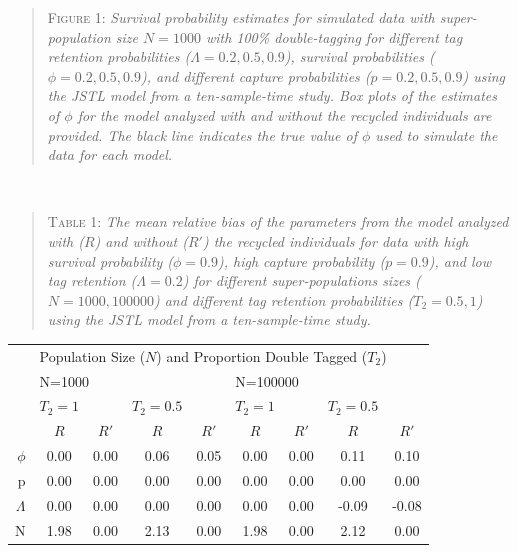 \documentclass[12pt]{article}
\begin{document}
\begin{quote}
\textsc{Figure 1:}
\textsl{Survival probability estimates for simulated data with super-population size $N=1000$ with 100\% double-tagging for different tag retention probabilities ($\Lambda=0.2,0.5,0.9$), survival probabilities ($\phi=0.2,0.5,0.9$), and different capture probabilities ($p=0.2,0.5,0.9$) using the JSTL model from a ten-sample-time study. Box plots of the estimates of $\phi$ for the model analyzed with and without the recycled individuals are provided. The black line indicates the true value of $\phi$ used to simulate the data for each model.}
\end{quote}

~ ~

\begin{quote}
\textsc{Table 1:}
\textsl{The mean relative bias of the parameters from the model analyzed with ($R$) and without ($R'$) the recycled individuals for data with high survival probability ($\phi=0.9$), high capture probability ($p=0.9$), and low tag retention ($\Lambda=0.2$)  for different super-populations sizes ($N=1000,100 000$) and different tag retention probabilities ($T_2=0.5,1$) using the JSTL model from a ten-sample-time study. }
\end{quote}

\begin{table}[ht]
\centering
\begin{tabular}{rcccccccc}
  \hline
  & \multicolumn{8}{l}{Population Size ($N$) and Proportion Double Tagged ($T_2$)} \\
  \cline{2-9}
  & \multicolumn{4}{l}{N=1000} & \multicolumn{4}{l}{N=100000} \\
  \cline {2-9}
 & $T_2=1$ && $T_2=0.5$ && $T_2=1$ && $T_2=0.5$ &  \\ 
  \cline {2-9}
  & $R$ & $R'$ & $R$ & $R'$ & $R$ & $R'$ & $R$ & $R'$ \\ 
  \hline
$\phi$ & 0.00 & 0.00 & 0.06 & 0.05 & 0.00 & 0.00 & 0.11 & 0.10 \\ 
  p & 0.00 & 0.00 & 0.00 & 0.00 & 0.00 & 0.00 & 0.00 & 0.00 \\ 
  $\Lambda$ & 0.00 & 0.00 & 0.00 & 0.00 & 0.00 & 0.00 & -0.09 & -0.08 \\ 
  N & 1.98 & 0.00 & 2.13 & 0.00 & 1.98 & 0.00 & 2.12 & 0.00 \\ 
   \hline
\end{tabular}
\end{table}

~ ~
\end{document}
